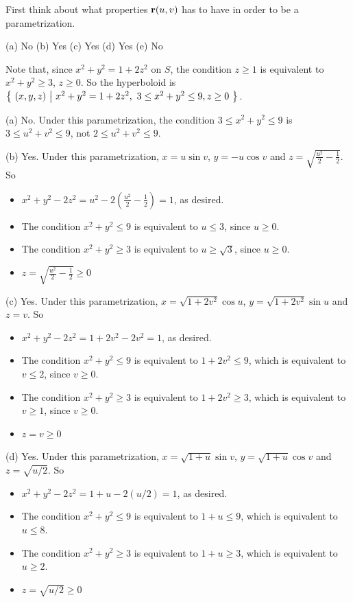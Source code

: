 \begin{hint} 
First think about what properties $\mathbf{r}(u,v)$ has to have in order to be
a parametrization.
\end{hint}

\begin{answer} 
(a) No\qquad
(b) Yes\qquad
(c) Yes\qquad
(d) Yes\qquad
(e) No
\end{answer}

\begin{solution} 
Note that, since $x^2+y^2=1+2z^2$ on $S$, the condition $z\ge 1$ is
equivalent to $x^2+y^2\ge 3$, $z\ge 0$. So the hyperboloid is
$\big\{ \ (x,y,z)\ \big|\ x^2+y^2=1+2z^2,\ 3\le x^2+y^2\le 9, z\ge 0\ \big\}$. 

(a) No. Under this parametrization, the condition $3\le x^2+y^2\le 9$
is $3\le u^2+v^2\le 9$, not $2\le u^2+v^2\le 9$.

\noindent (b) Yes. Under this parametrization, $x=u\sin v$, $y=-u\cos v$
and $z=\sqrt{\frac{u^2}{2}-\frac{1}{2}}$. So
\begin{itemize}\itemsep1pt \parskip0pt  %
\item[$\circ$]
$x^2+y^2-2z^2 = u^2-2\left(\frac{u^2}{2}-\frac{1}{2}\right) = 1$,
as desired. 
\item[$\circ$] The condition $x^2+y^2\le 9$ is equivalent to $u\le 3$, since
$u\ge 0$.
\item[$\circ$] The condition $x^2+y^2\ge 3$ is equivalent to $u\ge\sqrt{3}$,
since $u\ge 0$.
\item[$\circ$] $z=\sqrt{\frac{u^2}{2}-\frac{1}{2}}\ge 0$
\end{itemize}


\noindent (c) Yes. Under this parametrization, $x=\sqrt{1+2v^2}\cos u$, 
$y=\sqrt{1+2v^2}\sin u$ and $z=v$. So
\begin{itemize}\itemsep1pt \parskip0pt  %
\item[$\circ$]
$x^2+y^2-2z^2 = 1+2v^2 -2v^2 = 1$,
as desired. 
\item[$\circ$] The condition $x^2+y^2\le 9$ is equivalent to $1+2v^2\le 9$,
which is equivalent to $v\le 2$, since $v\ge 0$.
\item[$\circ$] The condition $x^2+y^2\ge 3$  is equivalent to $1+2v^2\ge 3$,
which is equivalent to $v\ge 1$, since $v\ge 0$.
\item[$\circ$] $z=v\ge 0$
\end{itemize}


\noindent (d) Yes. Under this parametrization, $x=\sqrt{1+u}\sin v$, 
$y=\sqrt{1+u}\cos v$ and $z=\sqrt{u/2}$. So
\begin{itemize}\itemsep1pt \parskip0pt  %
\item[$\circ$]
$x^2+y^2-2z^2 = 1+u -2(u/2) = 1$,
as desired. 
\item[$\circ$] The condition $x^2+y^2\le 9$ is equivalent to $1+u\le 9$,
which is equivalent to $u\le 8$.
\item[$\circ$] The condition $x^2+y^2\ge 3$  is equivalent to $1+u\ge 3$,
which is equivalent to $u\ge 2$.
\item[$\circ$] $z=\sqrt{u/2}\ge 0$
\end{itemize}


\end{solution}
